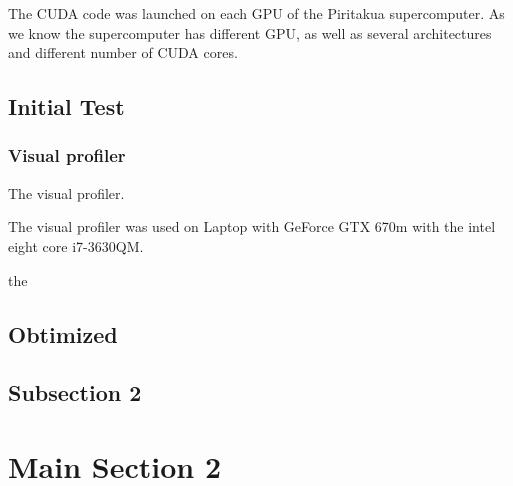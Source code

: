 The CUDA code was launched on each GPU of the Piritakua supercomputer. As we know the supercomputer has different GPU, as well as several architectures and different number of CUDA cores.



\subsection{Initial Test}



\subsubsection{Visual profiler}

The visual profiler.

The visual profiler was used on Laptop with GeForce GTX 670m with the intel eight core  i7-3630QM.


the


\subsection{Obtimized}



\subsection{Subsection 2}


\section{Main Section 2}
